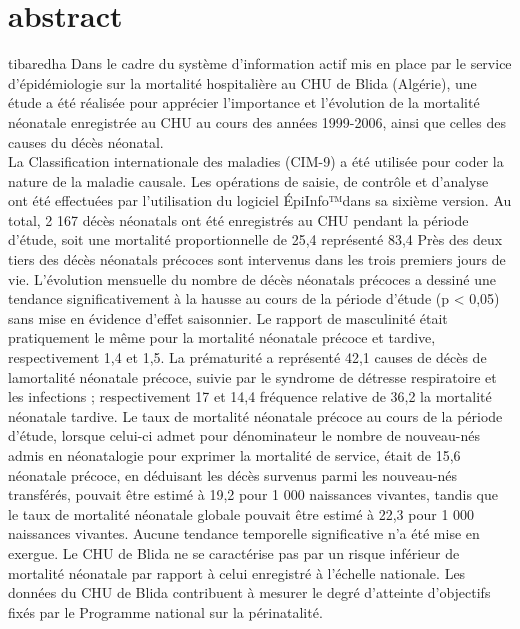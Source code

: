 \section{abstract}
\cite{ref1}
tibaredha
Dans le cadre du système d’information actif mis
en place par le service d’épidémiologie sur la mortalité
hospitalière au CHU de Blida (Algérie), une étude a été
réalisée pour apprécier l’importance et l’évolution de la
mortalité néonatale enregistrée au CHU au cours des années
1999-2006, ainsi que celles des causes du décès néonatal.\\
La Classification internationale des maladies (CIM-9) a
été utilisée pour coder la nature de la maladie causale. Les
opérations de saisie, de contrôle et d’analyse ont été effectuées
par l’utilisation du logiciel ÉpiInfo™dans sa sixième version.
Au total, 2 167 décès néonatals ont été enregistrés au CHU
pendant la période d’étude, soit une mortalité proportionnelle
de 25,4 %
représenté 83,4 %
Près des deux tiers des décès néonatals précoces sont
intervenus dans les trois premiers jours de vie. L’évolution
mensuelle du nombre de décès néonatals précoces a dessiné
une tendance significativement à la hausse au cours de la
période d’étude (p < 0,05) sans mise en évidence d’effet
saisonnier. Le rapport de masculinité était pratiquement le
même pour la mortalité néonatale précoce et tardive, respectivement
1,4 et 1,5. La prématurité a représenté 42,1 %
causes de décès de lamortalité néonatale précoce, suivie par le
syndrome de détresse respiratoire et les infections ; respectivement
17 et 14,4 %
fréquence relative de 36,2 %
la mortalité néonatale tardive. Le taux de mortalité néonatale
précoce au cours de la période d’étude, lorsque celui-ci admet
pour dénominateur le nombre de nouveau-nés admis en
néonatalogie pour exprimer la mortalité de service, était de
15,6 %
néonatale précoce, en déduisant les décès survenus parmi
les nouveau-nés transférés, pouvait être estimé à 19,2 pour
1 000 naissances vivantes, tandis que le taux de mortalité
néonatale globale pouvait être estimé à 22,3 pour 1 000 naissances
vivantes. Aucune tendance temporelle significative n’a
été mise en exergue. Le CHU de Blida ne se caractérise pas par
un risque inférieur de mortalité néonatale par rapport à celui
enregistré à l’échelle nationale. Les données du CHU de Blida
contribuent à mesurer le degré d’atteinte d’objectifs fixés par
le Programme national sur la périnatalité.